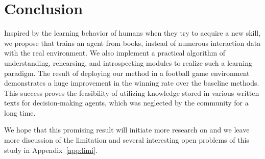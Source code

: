 \vspace{-1mm}
\section{Conclusion}
\vspace{-1mm}

Inspired by the learning behavior of humans when they try to acquire a new skill, we propose {\topic} that trains an agent from books, instead of numerous interaction data with the real environment. We also implement a practical algorithm of understanding, rehearsing, and introspecting modules to realize such a learning paradigm. The result of deploying our method in a football game environment demonstrates a huge improvement in the winning rate over the baseline methods. This success proves the feasibility of utilizing knowledge stored in various written texts for decision-making agents, which was neglected by the community for a long time. 

We hope that this promising result will initiate more research on {\topic} and we leave more discussion of the limitation and several interesting open problems of this study in Appendix~\ref{app:limi}.






